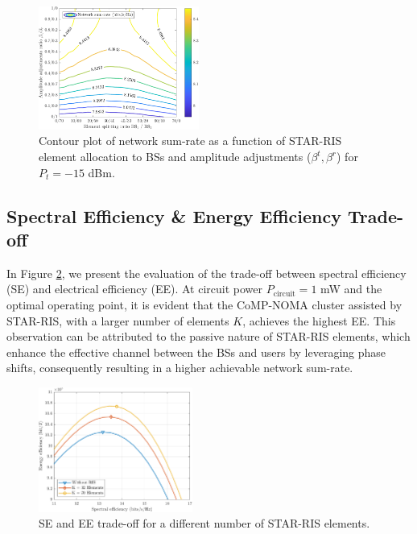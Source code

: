 \documentclass[conference]{IEEEtran}
\begin{document}
\begin{figure}[b]
    \centering
    \includegraphics[width=0.47\textwidth]{figs/dynamic_s.pdf}
    \caption{Contour plot of network sum-rate as a function of STAR-RIS element allocation to BSs and amplitude adjustments ($\beta^t, \beta^r$) for $P_t =-15$ dBm.}
    \label{fig:dynamic}
\end{figure}

\subsection{Spectral Efficiency \& Energy Efficiency Trade-off}
In Figure \ref{fig:se_vs_ee}, we present the evaluation of the trade-off between spectral efficiency (SE) and electrical efficiency (EE). At circuit power $P_{\text{circuit}} = 1$ mW and the optimal operating point, it is evident that the CoMP-NOMA cluster assisted by STAR-RIS, with a larger number of elements $K$, achieves the highest EE. This observation can be attributed to the passive nature of STAR-RIS elements, which enhance the effective channel between the BSs and users by leveraging phase shifts, consequently resulting in a higher achievable network sum-rate.
\begin{figure}[h]
    \centering
    \includegraphics[width=0.45\textwidth]{figs/se_vs_ee.pdf}
    \caption{SE and EE trade-off for a different number of STAR-RIS elements.}
    \label{fig:se_vs_ee}
\end{figure}
\end{document}
